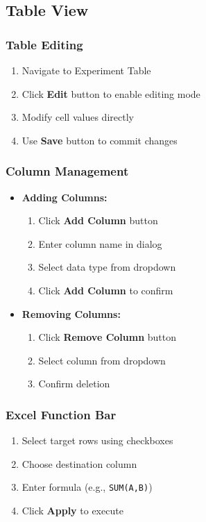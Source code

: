 \documentclass[12pt]{article}
\begin{document}
\subsection{Table View}

\subsubsection{Table Editing}
\begin{enumerate}
    \item Navigate to Experiment Table
    \item Click \textbf{Edit} button to enable editing mode
    \item Modify cell values directly
    \item Use \textbf{Save} button to commit changes
\end{enumerate}

\subsubsection{Column Management}
\begin{itemize}
    \item \textbf{Adding Columns:}
    \begin{enumerate}
        \item Click \textbf{Add Column} button
        \item Enter column name in dialog
        \item Select data type from dropdown
        \item Click \textbf{Add Column} to confirm
    \end{enumerate}
    
    \item \textbf{Removing Columns:}
    \begin{enumerate}
        \item Click \textbf{Remove Column} button
        \item Select column from dropdown
        \item Confirm deletion
    \end{enumerate}
\end{itemize}

\subsubsection{Excel Function Bar}
\begin{enumerate}
    \item Select target rows using checkboxes
    \item Choose destination column
    \item Enter formula (e.g., \texttt{SUM(A,B)})
    \item Click \textbf{Apply} to execute
\end{enumerate}
\end{document}
